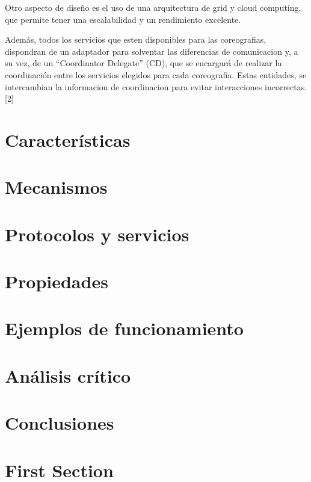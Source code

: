 \documentclass[runningheads]{llncs}
\begin{document}
Otro aspecto de diseño es el uso de una arquitectura de grid y cloud computing, que permite tener una escalabilidad y un rendimiento excelente.

Además, todos los servicios que esten disponibles para las coreografias, dispondran de un adaptador para solventar las diferencias de comunicacion y, a su vez, de un ``Coordinator Delegate'' (CD), que se encargará de realizar la coordinación entre los servicios elegidos para cada coreografia. Estas entidades, se intercambian la informacion de coordinacion para evitar interacciones incorrectas. [2]

\section{Características}
\section{Mecanismos}
\section{Protocolos y servicios}
\section{Propiedades}
\section{Ejemplos de funcionamiento}
\section{Análisis crítico}
\section{Conclusiones}
\section{First Section}
\end{document}
